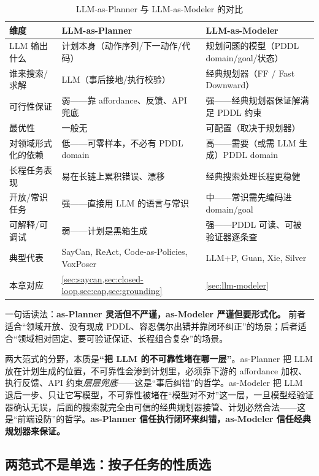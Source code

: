 \begin{table}[H]\centering\small
\caption{LLM-as-Planner 与 LLM-as-Modeler 的对比}
\label{tab:paradigm-compare}
\begin{tabular}{p{3.2cm}p{4.6cm}p{4.6cm}}
\toprule
维度 & LLM-as-Planner & LLM-as-Modeler \\
\midrule
LLM 输出什么 & 计划本身（动作序列/下一动作/代码） & 规划问题的模型（PDDL domain/goal/状态） \\
谁来搜索/求解 & LLM（事后接地/执行校验） & 经典规划器（FF / Fast Downward） \\
可行性保证 & 弱——靠 affordance、反馈、API 兜底 & 强——经典规划器保证解满足 PDDL 约束 \\
最优性 & 一般无 & 可配置（取决于规划器） \\
对领域形式化的依赖 & 低——可零样本，不必有 PDDL domain & 高——需要（或需 LLM 生成）PDDL domain \\
长程任务表现 & 易在长链上累积错误、漂移 & 经典搜索处理长程更稳健 \\
开放/常识任务 & 强——直接用 LLM 的语言与常识 & 中——常识需先编码进 domain/goal \\
可解释/可调试 & 弱——计划是黑箱生成 & 强——PDDL 可读、可被验证器逐条查 \\
典型代表 & SayCan, ReAct, Code-as-Policies, VoxPoser & LLM+P, Guan, Xie, Silver \\
本章对应 & \cref{sec:saycan,sec:closed-loop,sec:cap,sec:grounding} & \cref{sec:llm-modeler} \\
\bottomrule
\end{tabular}
\end{table}

\noindent 一句话读法：\textbf{as-Planner 灵活但不严谨，as-Modeler 严谨但要形式化。} 前者适合“领域开放、没有现成 PDDL、容忍偶尔出错并靠闭环纠正”的场景；后者适合“领域相对固定、要可验证保证、长程组合复杂”的场景。

\begin{insight}
两大范式的分野，本质是\textbf{“把 LLM 的不可靠性堵在哪一层”}。as-Planner 把 LLM 放在计划生成的位置，不可靠性会渗到计划里，必须靠下游的 affordance 加权、执行反馈、API 约束\emph{层层兜底}——这是“事后纠错”的哲学。as-Modeler 把 LLM 退后一步、只让它写模型，不可靠性被堵在“模型对不对”这一层，一旦模型经验证器确认无误，后面的搜索就完全由可信的经典规划器接管、计划必然合法——这是“前端设防”的哲学。\textbf{as-Planner 信任执行闭环来纠错，as-Modeler 信任经典规划器来保证。}
\end{insight}

\subsection{两范式不是单选：按子任务的性质选}
\label{sec:paradigm-mix}

